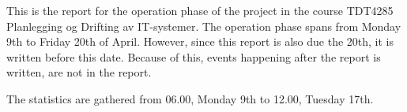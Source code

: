 This is the report for the operation phase of the project in the course TDT4285 Planlegging og Drifting av IT-systemer. The operation phase spans from Monday 9th to Friday 20th of April. However, since this report is also due the 20th, it is written before this date. Because of this, events happening after the report is written, are not in the report. 

The statistics are gathered from 06.00, Monday 9th to 12.00, Tuesday 17th.
